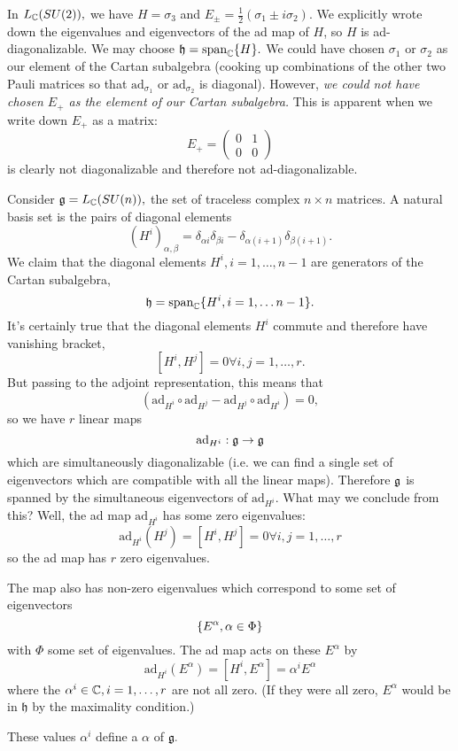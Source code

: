 \begin{exm}
In $L_{\mathbb{C}}(SU(2)),$ we have $H=\sigma_3$ and $E_{\pm}=\frac{1}{2}(\sigma_1\pm i\sigma_2)$. We explicitly wrote down the eigenvalues and eigenvectors of the ad map of $H$, so $H$ is ad-diagonalizable. We may choose
$\mathfrak{h}=\text{span}_{\mathbb{C}} \{H\}.$
We could have chosen $\sigma_1$ or $\sigma_2$ as our element of the Cartan subalgebra (cooking up combinations of the other two Pauli matrices so that $\text{ad}_{\sigma_1}$ or $\text{ad}_{\sigma_2}$ is diagonal). However, \emph{we could not have chosen $E_+$ as the element of our Cartan subalgebra.} This is apparent when we write down $E_+$ as a matrix:
$$E_+=\begin{pmatrix}
0&1\\0&0
\end{pmatrix}$$
is clearly not diagonalizable and therefore not ad-diagonalizable.
\end{exm}
\begin{exm}
Consider $\mathfrak{g}=L_{\mathbb{C}} (SU(n)),$ the set of traceless complex $n\times n$ matrices. A natural basis set is the pairs of diagonal elements
$$(H^i)_{\alpha,\beta}=\delta_{\alpha i} \delta_{\beta i}-\delta_{\alpha (i+1)}\delta_{\beta(i+1)}.$$
We claim that the diagonal elements $H^i, i=1,\ldots, n-1$ are generators of the Cartan subalgebra,
$$\mathfrak{h}=\text{span}_{\mathbb{C}}\{H^i, i=1,\ldots n-1\}.$$
It's certainly true that the diagonal elements $H^i$ commute and therefore have vanishing bracket,
$$[H^i,H^j]=0\forall i,j=1,\ldots,r.$$
But passing to the adjoint representation, this means that
$$(\text{ad}_{H^i}\circ \text{ad}_{H^j} - \text{ad}_{H^j}\circ \text{ad}_{H^i})=0,$$
so we have $r$ linear maps
$$\text{ad}_{H^i}:\mathfrak{g} \to \mathfrak{g}$$
which are simultaneously diagonalizable (i.e. we can find a single set of eigenvectors which are compatible with all the linear maps).
Therefore $\mathfrak{g}$ is spanned by the simultaneous eigenvectors of $\text{ad}_{H^i}.$ What may we conclude from this? Well, the ad map $\text{ad}_{H^i}$ has some zero eigenvalues:
$$\text{ad}_{H^i}(H^j)=[H^i,H^j]=0\forall i,j =1,\ldots,r$$
so the ad map has $r$ zero eigenvalues.

The map also has non-zero eigenvalues which correspond to some set of eigenvectors
$$\{E^\alpha, \alpha \in \Phi\}$$
with $\Phi$ some set of eigenvalues. The ad map acts on these $E^\alpha$ by
$$\text{ad}_{H^i}(E^\alpha)=[H^i, E^\alpha]=\alpha^i E^\alpha$$
where the $\alpha^i\in \mathbb{C}, i=1,\ldots, r$ are not all zero. (If they were all zero, $E^\alpha$ would be in $\mathfrak{h}$ by the maximality condition.)
\end{exm}
\begin{defn}
These values $\alpha^i$ define a  $\alpha$ of $\mathfrak{g}.$
\end{defn}

